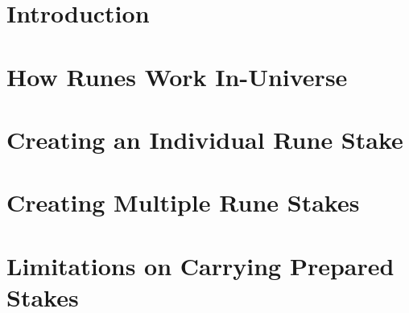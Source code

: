 \section{Introduction}

\section{How Runes Work In-Universe}

\section{Creating an Individual Rune Stake}

\section{Creating Multiple Rune Stakes}

\section{Limitations on Carrying Prepared Stakes}
